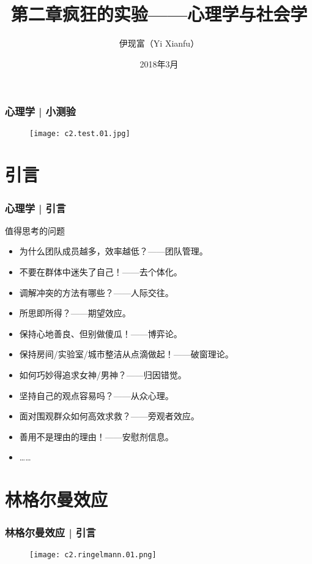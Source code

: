 



\title[心理学与社会学]{第二章\quad 疯狂的实验——心理学与社会学}
\author[Yixf]{伊现富（Yi Xianfu）}
\date{2018年3月}



\begin{frame}
  \frametitle{心理学 | 小测验}
  \begin{figure}
    \centering
    \texttt{[image: c2.test.01.jpg]}
  \end{figure}
\end{frame}

\section{引言}
\begin{frame}
  \frametitle{心理学 | 引言}
  \begin{block}{值得思考的问题}
    \begin{itemize}
      \item 为什么团队成员越多，效率越低？——团队管理。
      \item 不要在群体中迷失了自己！——去个体化。
      \item 调解冲突的方法有哪些？——人际交往。
      \item 所思即所得？——期望效应。
      \item 保持心地善良、但别做傻瓜！——博弈论。
      \item 保持房间/实验室/城市整洁从点滴做起！——破窗理论。
      \item 如何巧妙得追求女神/男神？——归因错觉。
      \item 坚持自己的观点容易吗？——从众心理。
      \item 面对围观群众如何高效求救？——旁观者效应。
      \item 善用不是理由的理由！——安慰剂信息。
      \item ……
    \end{itemize}
  \end{block}
\end{frame}

\section{林格尔曼效应}
\begin{frame}
  \frametitle{林格尔曼效应 | 引言}
  \begin{figure}
    \centering
    \texttt{[image: c2.ringelmann.01.png]}
  \end{figure}
\end{frame}

